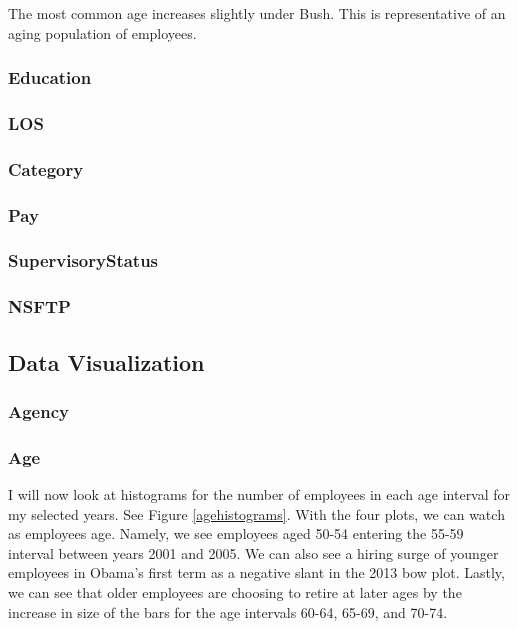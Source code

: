 \documentclass{article}
\begin{document}
        The most common age increases slightly under Bush. This is representative of an aging population of employees.

        \subsubsection{Education}


        \subsubsection{LOS}

        \subsubsection{Category}

        \subsubsection{Pay}

        \subsubsection{SupervisoryStatus}

        \subsubsection{NSFTP}

    \subsection{Data Visualization}

        \subsubsection{Agency}

        \subsubsection{Age}
        I will now look at histograms for the number of employees in each age interval for my selected years. See Figure \ref{agehistograms}. With the four plots, we can watch as employees age. Namely, we see employees aged 50-54 entering the 55-59 interval between years 2001 and 2005. We can also see a hiring surge of younger employees in Obama's first term as a negative slant in the 2013 bow plot. Lastly, we can see that older employees are choosing to retire at later ages by the increase in size of the bars for the age intervals 60-64, 65-69, and 70-74.
\end{document}
